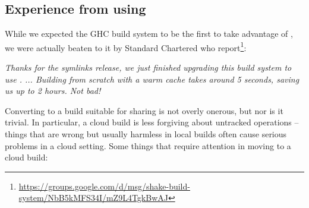 \subsection{Experience from using \Cloud \Shake}\label{sec-using-cloud-shake}

While we expected the GHC build system to be the first to take advantage of
\Cloud \Shake, we were actually beaten to it by Standard Chartered who
report\footnote{\url{https://groups.google.com/d/msg/shake-build-system/NbB5kMFS34I/mZ9L4TgkBwAJ}}:

\vspace{1mm}
\begin{center}
\parbox{0.8 \textwidth}{\emph{Thanks for the symlinks release, we just finished upgrading this build
system to use \cmd{-}. ... Building from scratch with a warm cache
takes around 5 seconds, saving us up to 2 hours. Not bad!}}
\end{center}
\vspace{1mm}


Converting to a build suitable for sharing is not overly onerous, but nor is it trivial.
In particular, a cloud build is less forgiving about untracked operations -- things that
are wrong but usually harmless in local builds often cause serious problems in a cloud setting.
Some things that require attention in moving to a cloud build:

